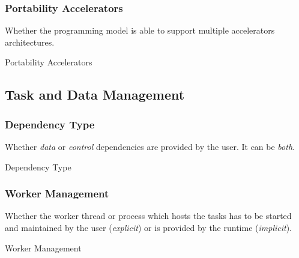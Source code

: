 \subsubsection{Portability Accelerators}
Whether the programming model is able to support multiple accelerators architectures.
\begin{table}[H]
	\caption{Portability Accelerators}
	\centering
	\begin{multicols}{2}
		

		
	\end{multicols}
\end{table}

\subsection{Task and Data Management}
\subsubsection{Dependency Type}
Whether \textit{data} or \textit{control} dependencies are provided by the user.
It can be \textit{both}.
\begin{table}[H]
	\caption{Dependency Type}
	\centering
	\begin{multicols}{2}
		

		
	\end{multicols}
\end{table}

\subsubsection{Worker Management}
Whether the worker thread or process which hosts the tasks has to be started and maintained by the user (\textit{explicit}) or is provided by the runtime (\textit{implicit}).
\begin{table}[H]
	\caption{Worker Management}
	\centering
	\begin{multicols}{2}
		

		
	\end{multicols}
\end{table}


